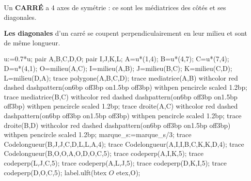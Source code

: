 \begin{minipage}{0.75\linewidth}
    \begin{propriete}[\admise]
        Un \textbf{CARRÉ} a 4 axes de symétrie : ce sont les médiatrices des côtés et ses diagonales.
    \end{propriete}
    \begin{remarque}

        \textbf{Les diagonales} d'un carré se coupent perpendiculairement en leur milieu et sont de même longueur.
    \end{remarque}
\end{minipage}
\begin{minipage}{0.2\linewidth}
    \begin{center}
        \begin{Geometrie}[CoinHD={(5.6u,5.6u)}]
            u:=0.7*u;
            pair A,B,C,D,O;
            pair I,J,K,L;
            A=u*(1,4);
            B=u*(4,7);
            C=u*(7,4);
            D=u*(4,1);
            O=milieu(A,C);
            I=milieu(A,B);
            J=milieu(B,C);
            K=milieu(C,D);
            L=milieu(D,A);
            trace polygone(A,B,C,D);
            trace mediatrice(A,B) withcolor red dashed dashpattern(on6bp off3bp on1.5bp off3bp) withpen pencircle scaled 1.2bp;
            trace mediatrice(B,C) withcolor red dashed dashpattern(on6bp off3bp on1.5bp off3bp) withpen pencircle scaled 1.2bp;
            trace droite(A,C) withcolor red dashed dashpattern(on6bp off3bp on1.5bp off3bp) withpen pencircle scaled 1.2bp;
            trace droite(B,D) withcolor red dashed dashpattern(on6bp off3bp on1.5bp off3bp) withpen pencircle scaled 1.2bp;
            marque_s:=marque_s/3;
            trace Codelongueur(B,J,J,C,D,L,L,A,4);
            trace Codelongueur(A,I,I,B,C,K,K,D,4);
            trace Codelongueur(B,O,O,A,O,D,O,C,5);
            trace codeperp(A,I,K,5);
            trace codeperp(L,J,C,5);
            trace codeperp(A,L,J,5);
            trace codeperp(D,K,I,5);
            trace codeperp(D,O,C,5);
            label.ulft(btex $O$ etex,O);
        \end{Geometrie}
    \end{center}
\end{minipage} 
